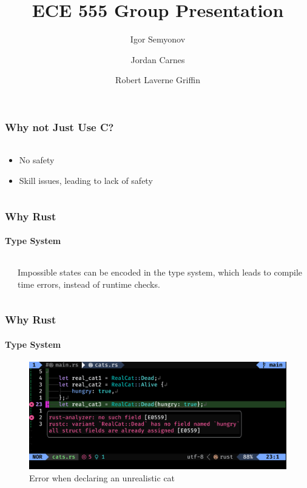 \documentclass[aspectratio=169]{beamer}
\title[Short Title]{
    ECE 555 Group Presentation
}
\author{
	Igor Semyonov
	\and Jordan Carnes
	\and Robert Laverne Griffin
}
\institute{
    George Macon University, Department of Electrical and Computer Engineering
}
\begin{document}
\begin{frame}
	\vspace{-1.8cm}
	\titlepage
\end{frame}

\begin{frame}
	\frametitle{Why not Just Use C?}
	\framesubtitle{}

	\begin{columns}
		\begin{column}{0.4\textwidth}
			\begin{itemize}
				\item No safety
				\item Skill issues, leading to lack of safety
			\end{itemize}
		\end{column}
	\end{columns}
\end{frame}

\begin{frame}
	\frametitle{Why Rust}
	\framesubtitle{Type System}

	\begin{columns}
		\begin{column}{0.4\textwidth}
			
		\end{column}
		\begin{column}{0.5\textwidth}
			Impossible states can be encoded in the type system, which leads to compile time errors, instead of runtime checks.
			
		\end{column}
	\end{columns}
\end{frame}

\begin{frame}
	\frametitle{Why Rust}
	\framesubtitle{Type System}
	\begin{figure}[ht]
		\centering
		\includegraphics[width=\textwidth]{./figures/real-cat.png}
		\caption{Error when declaring an unrealistic cat}
	\end{figure}
\end{frame}
\end{document}
